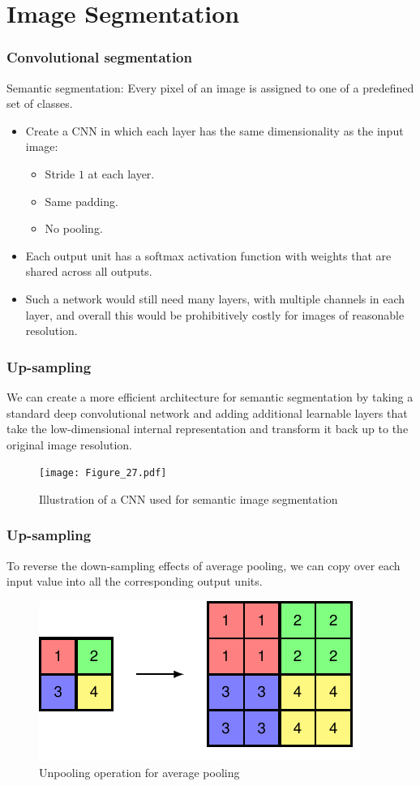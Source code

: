 \documentclass{beamer}
\begin{document}
\section{Image Segmentation}

\begin{frame}
    \frametitle{Convolutional segmentation}
    Semantic segmentation: Every pixel of an image is assigned to one of a predefined set of classes.
    \begin{itemize}
        \item Create a CNN in which each layer has the same dimensionality as the input image:
        \begin{itemize}
            \item Stride $1$ at each layer.
            \item Same padding.
            \item No pooling.
        \end{itemize}
        \item Each output unit has a softmax activation function with weights that are shared across all outputs.
        \item Such a network would still need many layers, with multiple channels in each layer, and overall this would be prohibitively costly for images of reasonable resolution.
    \end{itemize}
\end{frame}

\begin{frame}
    \frametitle{Up-sampling}
    We can create a more efficient architecture for semantic segmentation by taking a standard deep convolutional network and adding additional learnable layers that take the low-dimensional internal representation and transform it back up to the original image resolution.
    \begin{figure}
        \caption{Illustration of a CNN used for semantic image segmentation}
        \texttt{[image: Figure\_27.pdf]}
    \end{figure}
\end{frame}

\begin{frame}
    \frametitle{Up-sampling}
    To reverse the down-sampling effects of average pooling, we can copy over each input value into all the corresponding output units.
    \begin{figure}
        \caption{Unpooling operation for average pooling}
        \includegraphics{Figure_28_a.pdf}
    \end{figure}
\end{frame}
\end{document}
